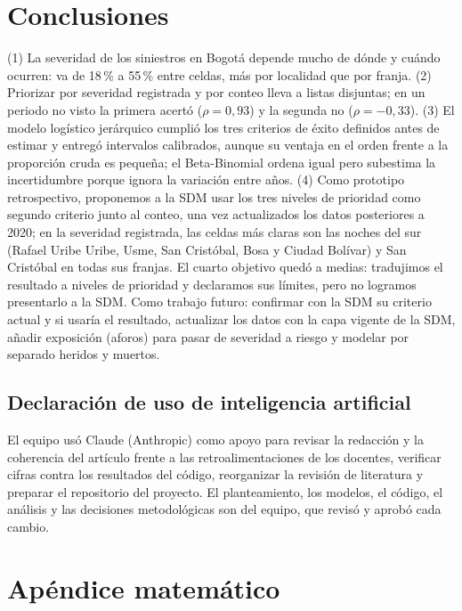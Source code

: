 \documentclass[10pt,twocolumn]{article}
\begin{document}
\section{Conclusiones}\label{sec:con}
(1) La severidad de los siniestros en Bogotá depende mucho de dónde y cuándo ocurren: va de 18\,\% a 55\,\% entre celdas, más por localidad que por franja. (2) Priorizar por severidad registrada y por conteo lleva a listas disjuntas; en un periodo no visto la primera acertó ($\rho=0{,}93$) y la segunda no ($\rho=-0{,}33$). (3) El modelo logístico jerárquico cumplió los tres criterios de éxito definidos antes de estimar y entregó intervalos calibrados, aunque su ventaja en el orden frente a la proporción cruda es pequeña; el Beta-Binomial ordena igual pero subestima la incertidumbre porque ignora la variación entre años. (4) Como prototipo retrospectivo, proponemos a la SDM usar los tres niveles de prioridad como segundo criterio junto al conteo, una vez actualizados los datos posteriores a 2020; en la severidad registrada, las celdas más claras son las noches del sur (Rafael Uribe Uribe, Usme, San Cristóbal, Bosa y Ciudad Bolívar) y San Cristóbal en todas sus franjas. El cuarto objetivo quedó a medias: tradujimos el resultado a niveles de prioridad y declaramos sus límites, pero no logramos presentarlo a la SDM. Como trabajo futuro: confirmar con la SDM su criterio actual y si usaría el resultado, actualizar los datos con la capa vigente de la SDM, añadir exposición (aforos) para pasar de severidad a riesgo y modelar por separado heridos y muertos.

\subsection*{Declaración de uso de inteligencia artificial}
El equipo usó Claude (Anthropic) como apoyo para revisar la redacción y la coherencia del artículo frente a las retroalimentaciones de los docentes, verificar cifras contra los resultados del código, reorganizar la revisión de literatura y preparar el repositorio del proyecto. El planteamiento, los modelos, el código, el análisis y las decisiones metodológicas son del equipo, que revisó y aprobó cada cambio.




\appendix
\section{Apéndice matemático}\label{sec:apx}
\end{document}
